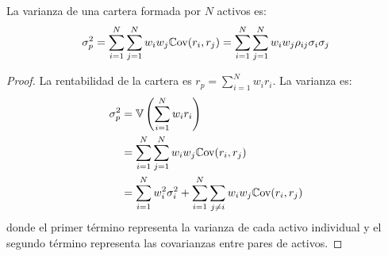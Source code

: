 \begin{teorema}
La varianza de una cartera formada por $N$ activos es:
\begin{equation}
\sigma_p^2 = \sum_{i=1}^{N} \sum_{j=1}^{N} w_i w_j \mathbb{C}\text{ov}(r_i, r_j) = \sum_{i=1}^{N} \sum_{j=1}^{N} w_i w_j \rho_{ij} \sigma_i \sigma_j
\end{equation}
\end{teorema}

\begin{proof}
La rentabilidad de la cartera es $r_p = \sum_{i=1}^{N} w_i r_i$. La varianza es:
\begin{align*}
\sigma_p^2 &= \mathbb{V}\left(\sum_{i=1}^{N} w_i r_i\right) \\
&= \sum_{i=1}^{N} \sum_{j=1}^{N} w_i w_j \mathbb{C}\text{ov}(r_i, r_j) \\
&= \sum_{i=1}^{N} w_i^2 \sigma_i^2 + \sum_{i=1}^{N} \sum_{j \neq i} w_i w_j \mathbb{C}\text{ov}(r_i, r_j)
\end{align*}
donde el primer término representa la varianza de cada activo individual y el segundo término representa las covarianzas entre pares de activos.
\end{proof}

